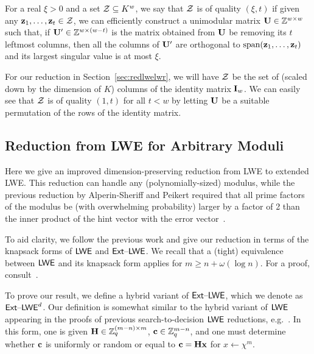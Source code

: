 \begin{definition}\label{def:quality} For a real $\xi > 0$ and a set $\mathcal{Z} \subseteq
  K^w$,
  we say that $\mathcal{Z}$ is of \textnormal{quality} $(\xi,t)$ if given
  any $\mathbf{z}_1, \ldots, \mathbf{z}_t \in \mathcal{Z}$, we can efficiently
  construct a unimodular matrix $\mathbf{U} \in \mathbb{Z}^{w \times w}$ such that,
  if $\mathbf{U}' \in \mathbb{Z}^{w \times (w-t)}$ is the matrix obtained from
  $\mathbf{U}$ be removing its $t$ leftmost columns, then all the columns
  of $\mathbf{U}'$ are orthogonal to $\text{span}(\mathbf{z}_1,\ldots,\mathbf{z}_t)$
  and its largest singular value is at most $\xi$.
\end{definition}

For our reduction in Section~\ref{sec:redlwelwr}, we will have $\mathcal{Z}$
be the set of (scaled down by the dimension of $K$) columns of the
identity matrix $\mathbf{I}_{w}$. We can easily see that $\mathcal{Z}$ is of
quality $(1,t)$ for all $t < w$ by letting $\mathbf{U}$ be a suitable
permutation of the rows of the identity matrix.
\fi


%

\subsection{Reduction from LWE for Arbitrary  Moduli}
\label{sec:impr-reduct-over}

Here we give an improved dimension-preserving reduction from LWE to
extended LWE. This reduction can handle any (polynomially-sized)
modulus, while the previous reduction by Alperin-Sheriff and Peikert required that all prime factors
of the modulus be (with overwhelming probability) larger by a factor
of 2 than the inner product of the hint vector with the error
vector~\cite{DBLP:conf/pkc/Alperin-SheriffP12}.

To aid clarity, we follow the previous work and give our reduction in
terms of the knapsack forms of $\mathsf{LWE}$ and $\mathsf{Ext \text{\textendash} LWE}$. We recall that a
(tight) equivalence between $\mathsf{LWE}$ and its knapsack form applies for
$m \geq n + \omega(\log{n})$. For a proof,
consult~\cite[Lemmas 4.8 and 4.9]{DBLP:conf/crypto/MicciancioM11}.


To prove our result, we define a hybrid variant of $\mathsf{Ext \text{\textendash} LWE}$, which we
denote as $\mathsf{Ext \text{\textendash} LWE}^{d}$. Our definition is somewhat similar
to the hybrid variant of $\mathsf{LWE}$ appearing in the proofs of previous
search-to-decision $\mathsf{LWE}$ reductions,
e.g.~\cite{DBLP:conf/eurocrypt/MicciancioP12}. In this form, one is
given $\mathbf{H} \in \mathbb{Z}_q^{(m-n) \times m}$, $\mathbf{c} \in \mathbb{Z}_q^{m-n}$, and
one must determine whether $\mathbf{c}$ is uniformly or random or equal to
$\mathbf{c}=\mathbf{H}\mathbf{x}$ for $x \gets \chi^m$. 


